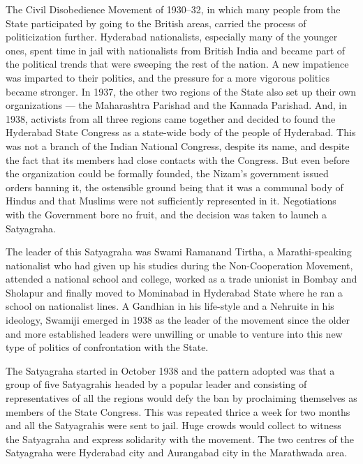 \begin{multicols}{2}
The Civil Disobedience Movement of 1930--32, in which many people from the State participated by going to the British areas, carried the process of politicization further. Hyderabad nationalists, especially many of the younger ones, spent time in jail with nationalists from British India and became part of the political trends that were sweeping the rest of the nation. A new impatience was imparted to their politics, and the pressure for a more vigorous politics became stronger. In 1937, the other two regions of the State also set up their own organizations --- the Maharashtra Parishad and the Kannada Parishad. And, in 1938, activists from all three regions came together and decided to found the Hyderabad State Congress as a state-wide body of the people of Hyderabad. This was not a branch of the Indian National Congress, despite its name, and despite the fact that its members had close contacts with the Congress. But even before the organization could be formally founded, the Nizam's government issued orders banning it, the ostensible ground being that it was a communal body of Hindus and that Muslims were not sufficiently represented in it. Negotiations with the Government bore no fruit, and the decision was taken to launch a Satyagraha. 

The leader of this Satyagraha was Swami Ramanand Tirtha, a Marathi-speaking nationalist who had given up his studies during the Non-Cooperation Movement, attended a national school and college, worked as a trade unionist in Bombay and Sholapur and finally moved to Mominabad in Hyderabad State where he ran a school on nationalist lines. A Gandhian in his life-style and a Nehruite in his ideology, Swamiji emerged in 1938 as the leader of the movement since the older and more established leaders were unwilling or unable to venture into this new type of politics of confrontation with the State. 

The Satyagraha started in October 1938 and the pattern adopted was that a group of five Satyagrahis headed by a popular leader and consisting of representatives of all the regions would defy the ban by proclaiming themselves as members of the State Congress. This was repeated thrice a week for two months and all the Satyagrahis were sent to jail. Huge crowds would collect to witness the Satyagraha and express solidarity with the movement. The two centres of the Satyagraha were Hyderabad city and Aurangabad city in the Marathwada area. 


\end{multicols}
